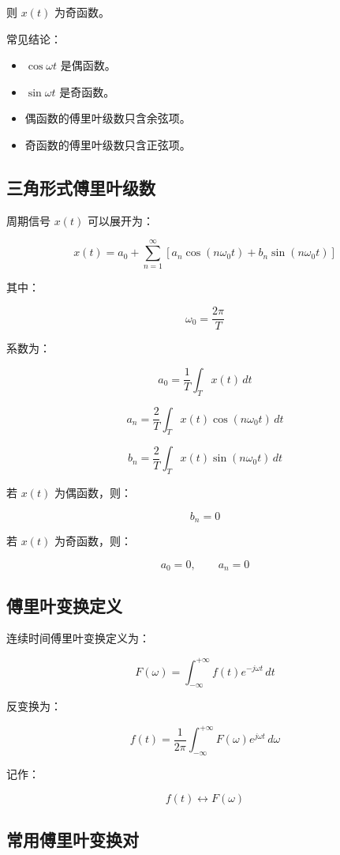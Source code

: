 \documentclass[UTF8]{ctexart}
\begin{document}
则 $x(t)$ 为奇函数。

常见结论：

\begin{itemize}
    \item $\cos \omega t$ 是偶函数。
    \item $\sin \omega t$ 是奇函数。
    \item 偶函数的傅里叶级数只含余弦项。
    \item 奇函数的傅里叶级数只含正弦项。
\end{itemize}

\subsection{三角形式傅里叶级数}

周期信号 $x(t)$ 可以展开为：

\[
x(t)=a_0+\sum_{n=1}^{\infty}\left[a_n\cos(n\omega_0 t)+b_n\sin(n\omega_0 t)\right]
\]

其中：

\[
\omega_0=\frac{2\pi}{T}
\]

系数为：

\[
a_0=\frac{1}{T}\int_{T}x(t)\,dt
\]

\[
a_n=\frac{2}{T}\int_{T}x(t)\cos(n\omega_0 t)\,dt
\]

\[
b_n=\frac{2}{T}\int_{T}x(t)\sin(n\omega_0 t)\,dt
\]

若 $x(t)$ 为偶函数，则：

\[
b_n=0
\]

若 $x(t)$ 为奇函数，则：

\[
a_0=0,\qquad a_n=0
\]

\subsection{傅里叶变换定义}

连续时间傅里叶变换定义为：

\[
F(\omega)=\int_{-\infty}^{+\infty}f(t)e^{-j\omega t}\,dt
\]

反变换为：

\[
f(t)=\frac{1}{2\pi}\int_{-\infty}^{+\infty}F(\omega)e^{j\omega t}\,d\omega
\]

记作：

\[
f(t)\leftrightarrow F(\omega)
\]

\subsection{常用傅里叶变换对}
\end{document}
